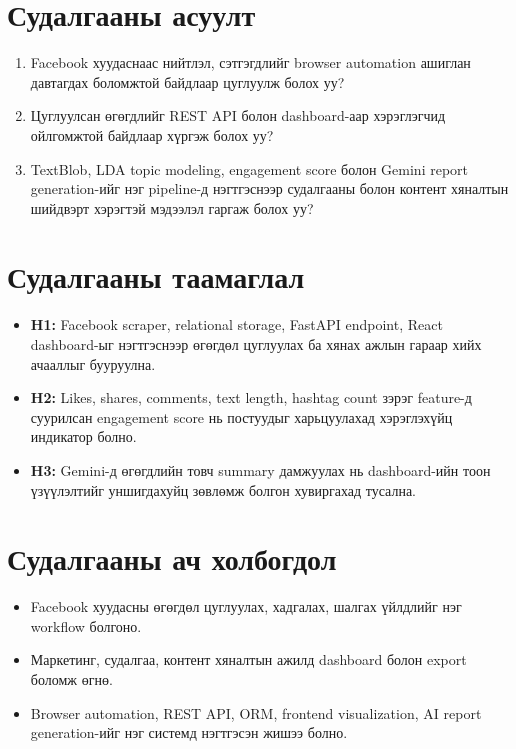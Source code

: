 \section{Судалгааны асуулт}

\begin{enumerate}
    \item Facebook хуудаснаас нийтлэл, сэтгэгдлийг browser automation ашиглан давтагдах боломжтой байдлаар цуглуулж болох уу?
    \item Цуглуулсан өгөгдлийг REST API болон dashboard-аар хэрэглэгчид ойлгомжтой байдлаар хүргэж болох уу?
    \item TextBlob, LDA topic modeling, engagement score болон Gemini report generation-ийг нэг pipeline-д нэгтгэснээр судалгааны болон контент хяналтын шийдвэрт хэрэгтэй мэдээлэл гаргаж болох уу?
\end{enumerate}

\section{Судалгааны таамаглал}

\begin{itemize}
    \item \textbf{H1:} Facebook scraper, relational storage, FastAPI endpoint, React dashboard-ыг нэгтгэснээр өгөгдөл цуглуулах ба хянах ажлын гараар хийх ачааллыг бууруулна.
    \item \textbf{H2:} Likes, shares, comments, text length, hashtag count зэрэг feature-д суурилсан engagement score нь постуудыг харьцуулахад хэрэглэхүйц индикатор болно.
    \item \textbf{H3:} Gemini-д өгөгдлийн товч summary дамжуулах нь dashboard-ийн тоон үзүүлэлтийг уншигдахуйц зөвлөмж болгон хувиргахад тусална.
\end{itemize}

\section{Судалгааны ач холбогдол}

\begin{itemize}
    \item Facebook хуудасны өгөгдөл цуглуулах, хадгалах, шалгах үйлдлийг нэг workflow болгоно.
    \item Маркетинг, судалгаа, контент хяналтын ажилд dashboard болон export боломж өгнө.
    \item Browser automation, REST API, ORM, frontend visualization, AI report generation-ийг нэг системд нэгтгэсэн жишээ болно.
\end{itemize}

